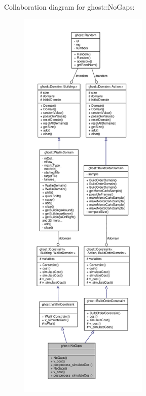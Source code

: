 Collaboration diagram for ghost\-:\-:No\-Gaps\-:
\nopagebreak
\begin{figure}[H]
\begin{center}
\leavevmode
\includegraphics[height=550pt]{classghost_1_1NoGaps__coll__graph}
\end{center}
\end{figure}
